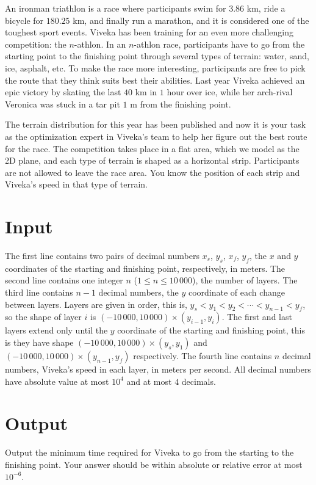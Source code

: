 

An ironman triathlon is a race where participants swim for $3.86$ km,
ride a bicycle for $180.25$ km, and finally run a marathon, and it is
considered one of the toughest sport events. Viveka has been training
for an even more challenging competition: the $n$-athlon. In an
$n$-athlon race, participants have to go from the starting point to
the finishing point through several types of terrain: water, sand,
ice, asphalt, etc. To make the race more interesting, participants are
free to pick the route that they think suits best their
abilities. Last year Viveka achieved an epic victory by skating the
last $40$ km in $1$ hour over ice, while her arch-rival Veronica was stuck in
a tar pit $1$ m from the finishing point.

The terrain distribution for this year has been published and now it
is your task as the optimization expert in Viveka's team to help her
figure out the best route for the race. The competition takes place in
a flat area, which we model as the 2D plane, and each type of terrain
is shaped as a horizontal strip. Participants are not allowed to leave
the race area. You know the position of each strip and Viveka's speed
in that type of terrain.

\section*{Input}
The first line contains two pairs of decimal numbers $x_s$, $y_s$,
$x_f$, $y_f$, the $x$ and $y$ coordinates of the starting and
finishing point, respectively, in meters. The second line contains one
integer $n$ ($1 \leq n \leq 10\,000$), the number of layers.  The
third line contains $n-1$ decimal numbers, the $y$ coordinate of each
change between layers.  Layers are given in order, this is,
$y_s < y_1 < y_2 < \cdots < y_{n-1} < y_f$, so the shape of layer $i$
is $(-10\,000,10\,000)\times(y_{i-1},y_{i})$. The first and last
layers extend only until the $y$ coordinate of the starting and
finishing point, this is they have shape
$(-10\,000,10\,000)\times(y_s,y_1)$ and
$(-10\,000,10\,000)\times(y_{n-1},y_f)$ respectively.
The fourth line contains $n$ decimal numbers, Viveka's speed in each
layer, in meters per second.  All decimal numbers have absolute value
at most $10^4$ and at most $4$ decimals.

\section*{Output}
Output the minimum time required for Viveka to go from the starting to
the finishing point. Your answer should be within absolute or relative
error at most $10^{-6}$.

